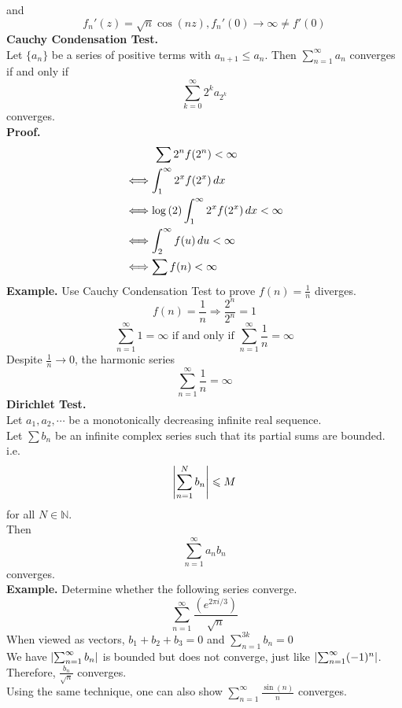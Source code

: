 \documentclass[11pt]{article}
\DeclarePairedDelimiter\abs{\lvert}{\rvert}
\begin{document}
and 
$$f_n'(z) = \sqrt{n}\cos(nz), f_n'(0) \to \infty \neq f'(0)$$
\newline 
\textbf{Cauchy Condensation Test.} \\
Let $\{a_n\}$ be a series of positive terms with $a_{n + 1} \leqslant a_n$. Then $\sum_{n = 1}^{\infty} a_n$ converges if and only if 
$$\sum_{k = 0}^{\infty} 2^ka_{2^k}$$ converges. \\
\textbf{Proof.} 
\begin{align*}
&\hspace{9mm} \sum {2^nf(2^n)} < \infty \\
&\Longleftrightarrow \int_{1}^{\infty}2^x f(2^x)\,dx \\ 
&\Longleftrightarrow \log{(2)}\int_1^{\infty}2^x f(2^x) \,dx < \infty \\
&\Longleftrightarrow \int_2^{\infty} f(u) \, du < \infty \\
&\Longleftrightarrow \sum f(n) < \infty
\end{align*}
\textbf{Example.} Use Cauchy Condensation Test to prove $f(n) = \frac{1}{n}$ diverges. \\
$$f(n) = \frac{1}{n} \Rightarrow \frac{2^n}{2^n} = 1$$
\begin{equation*}
\sum_{n = 1}^{\infty} 1 = \infty \mbox{ if and only if } \sum_{n = 1}^{\infty} \frac{1}{n} = \infty
\end{equation*}
Despite $\frac{1}{n} \to 0$, the harmonic series 
$$ \sum_{n = 1}^{\infty} \frac{1}{n} = \infty$$ 
\newline
\textbf{Dirichlet Test.} \\
Let $a_1, a_2, \cdots$ be a monotonically decreasing infinite real sequence. \\
Let $\sum {b_n}$ be an infinite complex series such that its partial sums are bounded. i.e. 
$$\abs*{\sum_{n = 1}^N {b_n}} \leqslant M $$
for all $N \in \mathbb{N}$. \\
Then 
$$\sum_{n = 1}^{\infty} a_nb_n$$
converges. \\
\newline
\textbf{Example.} Determine whether the following series converge. 
$$\sum_{n = 1}^{\infty} \frac{(e^{2\pi i /3})}{\sqrt{n}}$$
When viewed as vectors, $b_1 + b_2 + b_3 = 0$ and $\sum_{n = 1}^{3k} b_n = 0$\\
We have $\abs*{\sum_{n = 1}^{\infty} b_n}$ is bounded but does not converge, just like $\abs*{\sum_{n = 1}^{\infty} (-1)^n}$. \\
Therefore, $\frac{b_n}{\sqrt{n}}$ converges. \\
Using the same technique, one can also show $\sum_{n = 1}^{\infty} \frac{\sin(n)}{n}$ converges.
\end{document}
